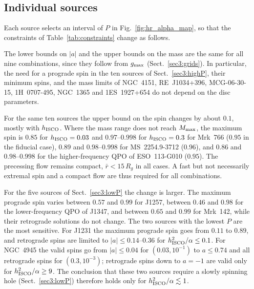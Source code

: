 \subsection{Individual sources}
\label{appA:sources}

Each source selects an interval of $P$ in Fig.~\ref{fig:hr_alpha_map}, so that the constraints of Table~\ref{tab:constraints} change as follows.

The lower bounds on $|a|$ and the upper bounds on the mass are the same for all nine combinations, since they follow from $g_\textup{max}$ (Sect.~\ref{sec3:grids}).
In particular, the need for a prograde spin in the ten sources of Sect.~\ref{sec3:highP}, their minimum spins, and the mass limits of NGC~4151, RE~J1034+396, MCG-06-30-15, 1H~0707-495, NGC~1365 and 1ES~1927+654 do not depend on the disc parameters.

For the same ten sources the upper bound on the spin changes by about $0.1$, mostly with $h_\textup{ISCO}$.
Where the mass range does not reach $M_\textup{max}$, the maximum spin is $0.85$ for $h_\textup{ISCO}=0.03$ and $0.97$--$0.998$ for $h_\textup{ISCO}=0.3$ for Mrk~766 ($0.95$ in the fiducial case), $0.89$ and $0.98$--$0.998$ for MS~2254.9-3712 ($0.96$), and $0.86$ and $0.98$--$0.998$ for the higher-frequency QPO of ESO~113-G010 ($0.95$).
The precessing flow remains compact, $\bar r<15\,R_g$ in all cases.
A fast but not necessarily extremal spin and a compact flow are thus required for all combinations.

For the five sources of Sect.~\ref{sec3:lowP} the change is larger.
The maximum prograde spin varies between $0.57$ and $0.99$ for J1257, between $0.46$ and $0.98$ for the lower-frequency QPO of J1347, and between $0.65$ and $0.99$ for Mrk~142, while their retrograde solutions do not change.
The two sources with the lowest $P$ are the most sensitive.
For J1231 the maximum prograde spin goes from $0.11$ to $0.89$, and retrograde spins are limited to $|a|\leq0.14$--$0.36$ for $h_\textup{ISCO}^{2}/\alpha\leq0.1$.
For NGC~4945 the valid spins go from $|a|\leq0.04$ for $(0.03,10^{-1})$ to $a\leq0.74$ and all retrograde spins for $(0.3,10^{-3})$; retrograde spins down to $a=-1$ are valid only for $h_\textup{ISCO}^{2}/\alpha\geq9$.
The conclusion that these two sources require a slowly spinning hole (Sect.~\ref{sec3:lowP}) therefore holds only for $h_\textup{ISCO}^{2}/\alpha\lesssim1$.

